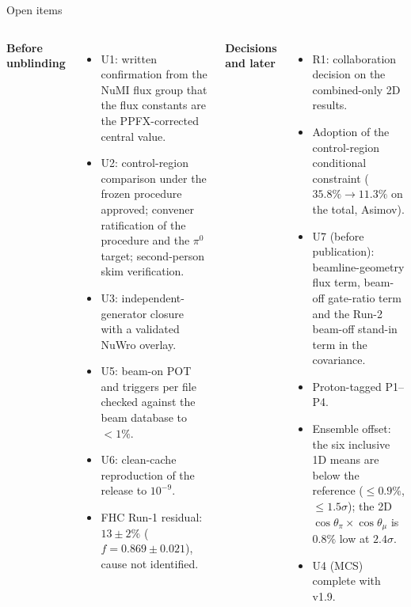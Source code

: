 \documentclass[aspectratio=169,10pt]{beamer}
\begin{document}
\begin{frame}{Open items}
  \begin{columns}[T]
  \textbf{\color{ubred}Before unblinding}
  \begin{itemize}\footnotesize\setlength\itemsep{2pt}
    \item U1: written confirmation from the NuMI flux group that the flux constants are the PPFX-corrected central value.
    \item U2: control-region comparison under the frozen procedure approved; convener ratification of the procedure
          and the $\pi^0$ target; second-person skim verification.
    \item U3: independent-generator closure with a validated NuWro overlay.
    \item U5: beam-on POT and triggers per file checked against the beam database to $<1\%$.
    \item U6: clean-cache reproduction of the release to $10^{-9}$.
    \item FHC Run-1 residual: $13\pm2\%$ ($f=0.869\pm0.021$), cause not identified.
  \end{itemize}
  \textbf{\color{ubred}Decisions and later}
  \begin{itemize}\footnotesize\setlength\itemsep{2pt}
    \item R1: collaboration decision on the combined-only 2D results.
    \item Adoption of the control-region conditional constraint ($35.8\%\to11.3\%$ on the total, Asimov).
    \item U7 (before publication): beamline-geometry flux term, beam-off gate-ratio term and the Run-2 beam-off
          stand-in term in the covariance.
    \item Proton-tagged P1--P4.
    \item Ensemble offset: the six inclusive 1D means are below the reference ($\leq0.9\%$, $\leq1.5\sigma$); the 2D
          $\cos\theta_\pi\times\cos\theta_\mu$ is $0.8\%$ low at $2.4\sigma$.
    \item U4 (MCS) complete with v1.9.
  \end{itemize}
  \end{columns}
\end{frame}
\end{document}

